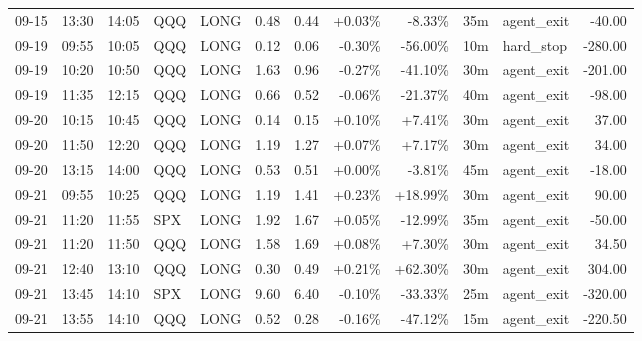 \documentclass[11pt,a4paper,twoside]{article}
\begin{document}
\begin{center}
\begin{longtable}{>{\color{txtmain}}l l l l l r r r r r >{\color{txtmain}}l r}
09-15 & 13:30 & 14:05 & QQQ & LONG & 0.48 & 0.44 & \textcolor{wingreen}{+0.03\%} & \textcolor{lossred}{-8.33\%} & 35m & agent\_exit & \textcolor{lossred}{-40.00} \\
09-19 & 09:55 & 10:05 & QQQ & LONG & 0.12 & 0.06 & \textcolor{lossred}{-0.30\%} & \textcolor{lossred}{-56.00\%} & 10m & hard\_stop & \textcolor{lossred}{-280.00} \\
09-19 & 10:20 & 10:50 & QQQ & LONG & 1.63 & 0.96 & \textcolor{lossred}{-0.27\%} & \textcolor{lossred}{-41.10\%} & 30m & agent\_exit & \textcolor{lossred}{-201.00} \\
09-19 & 11:35 & 12:15 & QQQ & LONG & 0.66 & 0.52 & \textcolor{lossred}{-0.06\%} & \textcolor{lossred}{-21.37\%} & 40m & agent\_exit & \textcolor{lossred}{-98.00} \\
09-20 & 10:15 & 10:45 & QQQ & LONG & 0.14 & 0.15 & \textcolor{wingreen}{+0.10\%} & \textcolor{wingreen}{+7.41\%} & 30m & agent\_exit & \textcolor{wingreen}{37.00} \\
09-20 & 11:50 & 12:20 & QQQ & LONG & 1.19 & 1.27 & \textcolor{wingreen}{+0.07\%} & \textcolor{wingreen}{+7.17\%} & 30m & agent\_exit & \textcolor{wingreen}{34.00} \\
09-20 & 13:15 & 14:00 & QQQ & LONG & 0.53 & 0.51 & \textcolor{wingreen}{+0.00\%} & \textcolor{lossred}{-3.81\%} & 45m & agent\_exit & \textcolor{lossred}{-18.00} \\
09-21 & 09:55 & 10:25 & QQQ & LONG & 1.19 & 1.41 & \textcolor{wingreen}{+0.23\%} & \textcolor{wingreen}{+18.99\%} & 30m & agent\_exit & \textcolor{wingreen}{90.00} \\
09-21 & 11:20 & 11:55 & SPX & LONG & 1.92 & 1.67 & \textcolor{wingreen}{+0.05\%} & \textcolor{lossred}{-12.99\%} & 35m & agent\_exit & \textcolor{lossred}{-50.00} \\
09-21 & 11:20 & 11:50 & QQQ & LONG & 1.58 & 1.69 & \textcolor{wingreen}{+0.08\%} & \textcolor{wingreen}{+7.30\%} & 30m & agent\_exit & \textcolor{wingreen}{34.50} \\
09-21 & 12:40 & 13:10 & QQQ & LONG & 0.30 & 0.49 & \textcolor{wingreen}{+0.21\%} & \textcolor{wingreen}{+62.30\%} & 30m & agent\_exit & \textcolor{wingreen}{304.00} \\
09-21 & 13:45 & 14:10 & SPX & LONG & 9.60 & 6.40 & \textcolor{lossred}{-0.10\%} & \textcolor{lossred}{-33.33\%} & 25m & agent\_exit & \textcolor{lossred}{-320.00} \\
09-21 & 13:55 & 14:10 & QQQ & LONG & 0.52 & 0.28 & \textcolor{lossred}{-0.16\%} & \textcolor{lossred}{-47.12\%} & 15m & agent\_exit & \textcolor{lossred}{-220.50} \\

\end{longtable}
\end{center}
\end{document}
